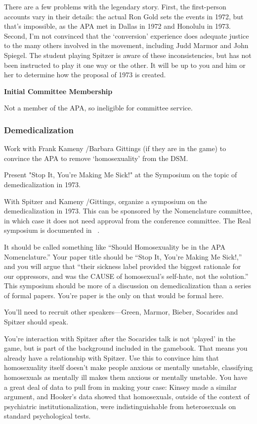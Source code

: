 \begin{refsection}
There are a few problems with the legendary story. First, the first-person accounts vary in their details: the actual Ron Gold sets the events in 1972, but that's impossible, as the APA met in Dallas in 1972 and Honolulu in 1973. Second, I'm not convinced that the `conversion' experience does adequate justice to the many others involved in the movement, including Judd Marmor and John Spiegel. The student playing Spitzer is aware of these inconsistencies, but has not been instructed to play it one way or the other. It will be up to you and him or her to determine how the proposal of 1973 is created.

\textbf{Initial Committee Membership}

Not a member of the APA, so ineligible for committee service.

\subsubsection{Demedicalization}
\label{demedicalization}

Work with Frank Kameny \slash  Barbara Gittings (if they are in the game) to convince the APA to remove `homosexuality' from the DSM.\\
\begin{writingtask}[Gold]\label{writingtask:goldA}Present "Stop It, You’re Making Me Sick!" at the Symposium on the topic of demedicalization in 1973.\end{writingtask}
With Spitzer and Kameny \slash  Gittings, organize a symposium on the demedicalization in 1973. This can be sponsored by the Nomenclature committee, in which case it does not need approval from the conference committee. The Real symposium is documented in ~\citep{Spitzer:1973wo}.

It should be called something like ``Should Homosexuality be in the APA Nomenclature.'' Your paper title should be “Stop It, You’re Making Me Sick!,” and you will argue that “their sickness label provided the biggest rationale for our oppressors, and was the CAUSE of homosexual’s self-hate, not the solution.” This symposium should be more of a discussion on demedicalization than a series of formal papers. You're paper is the only on that would be formal here.

You'll need to recruit other speakers---Green, Marmor, Bieber, Socarides and Spitzer should speak.

You're interaction with Spitzer after the Socarides talk is not `played' in the game, but is part of the background included in the gamebook. That means you already have a relationship with Spitzer. Use this to convince him that homosexuality itself doesn't make people anxious or mentally unstable, classifying homosexuals as mentally ill makes them anxious or mentally unstable. You have a great deal of data to pull from in making your case: Kinsey made a similar argument, and Hooker's data showed that homosexuals, outside of the context of psychiatric institutionalization, were indistinguishable from heterosexuals on standard psychological tests.


\end{refsection}

